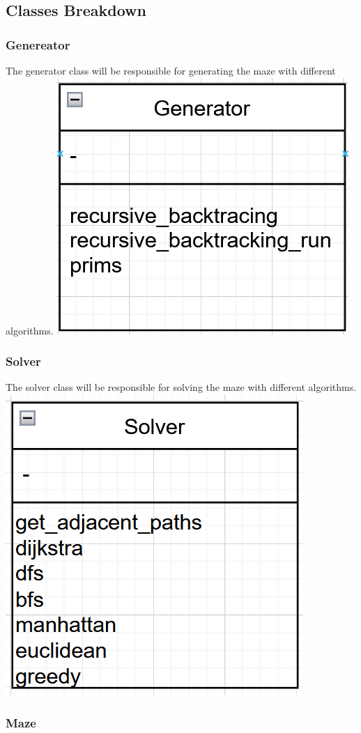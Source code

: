 \documentclass[titlepage]{article}
\begin{document}
\subsection{Classes Breakdown}

\subsubsection{Genereator}

The generator class will be responsible for generating the maze with different algorithms.
\newline
\includegraphics[width=0.5\linewidth]{assets/class diagrams/generator.PNG}

\subsubsection{Solver}

The solver class will be responsible for solving the maze with different algorithms.
\newline
\includegraphics[width=0.5\linewidth]{assets/class diagrams/solver.PNG}

\subsubsection{Maze}
\end{document}
